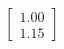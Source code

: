 \documentclass[preview]{standalone}
\begin{document}
\begin{align*}
\begin{bmatrix} 1.00 \\ 1.15 \end{bmatrix}
\end{align*}
\end{document}

